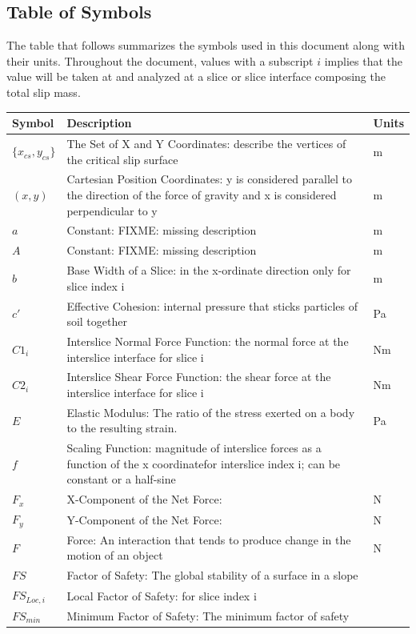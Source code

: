 \documentclass[12pt]{article}
\begin{document}
\subsection{Table of Symbols}
\label{Sec:ToS}
The table that follows summarizes the symbols used in this document along with their units. Throughout the document, values with a subscript $i$ implies that the value will be taken at and analyzed at a slice or slice interface composing the total slip mass.
\begin{longtabu}{l X[l] l}
\toprule
Symbol & Description & Units
\\
\midrule
$\{{x_{cs}}{,y_{cs}}\}$ & The Set of X and Y Coordinates: describe the vertices of the critical slip surface & m
\\
$(x,y)$ & Cartesian Position Coordinates: y is considered parallel to the direction of the force of gravity and x is considered perpendicular to y & m
\\
$a$ & Constant: FIXME: missing description & m
\\
$A$ & Constant: FIXME: missing description & m
\\
$b$ & Base Width of a Slice: in the x-ordinate direction only for slice index i & m
\\
$c'$ & Effective Cohesion: internal pressure that sticks particles of soil together & Pa
\\
${C1_{i}}$ & Interslice Normal Force Function: the normal force at the interslice interface for slice i & Nm
\\
${C2_{i}}$ & Interslice Shear Force Function: the shear force at the interslice interface for slice i & Nm
\\
$E$ & Elastic Modulus: The ratio of the stress exerted on a body to the resulting strain. & Pa
\\
$f$ & Scaling Function: magnitude of interslice forces as a function of the x coordinatefor interslice index i; can be constant or a half-sine & 
\\
${F_{x}}$ & X-Component of the Net Force:  & N
\\
${F_{y}}$ & Y-Component of the Net Force:  & N
\\
$F$ & Force: An interaction that tends to produce change in the motion of an object & N
\\
$FS$ & Factor of Safety: The global stability of a surface in a slope & 
\\
${FS_{Loc,i}}$ & Local Factor of Safety: for slice index i & 
\\
${FS_{min}}$ & Minimum Factor of Safety: The minimum factor of safety & 

\end{longtabu}
\end{document}
